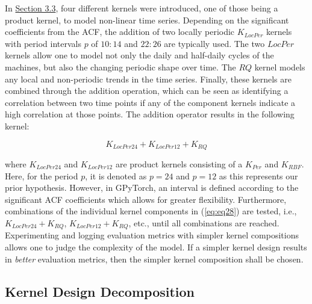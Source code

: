 In \hyperlink{subsection.3.3}{Section 3.3}, four different kernels were introduced, one of those being a product kernel, to model non-linear time series. Depending on the significant coefficients from the ACF, the addition of two locally periodic $K_{LocPer}$ kernels with period intervals $p$ of $10:14$ and $22:26$ are typically used. The two $LocPer$ kernels allow one to model not only the daily and half-daily cycles of the machines, but also the changing periodic shape over time. The $RQ$ kernel models any local and non-periodic trends in the time series. Finally, these kernels are combined through the addition operation, which can be seen as identifying a correlation between two time points if any of the component kernels indicate a high correlation at those points. The addition operator results in the following kernel:

\begin{equation}
    K_{LocPer24} + K_{LocPer12} + K_{RQ}
\label{eq:eq28}
\end{equation}

where $K_{LocPer24}$  and $K_{LocPer12}$ are product kernels consisting of a $K_{Per}$ and $K_{RBF}$. Here, for the period $p$, it is denoted as $p = 24$ and $p = 12$ as this represents our prior hypothesis. However, in GPyTorch, an interval is defined according to the significant ACF coefficients which allows for greater flexibility. Furthermore, combinations of the individual kernel components in (\ref{eq:eq28}) are tested, i.e., $K_{LocPer24} + K_{RQ}$, $K_{LocPer12} + K_{RQ}$, etc., until all combinations are reached. Experimenting and logging evaluation metrics with simpler kernel compositions allows one to judge the complexity of the model. If a simpler kernel design results in \textit{better} evaluation metrics, then the simpler kernel composition shall be chosen. 

\subsection{Kernel Design Decomposition}

